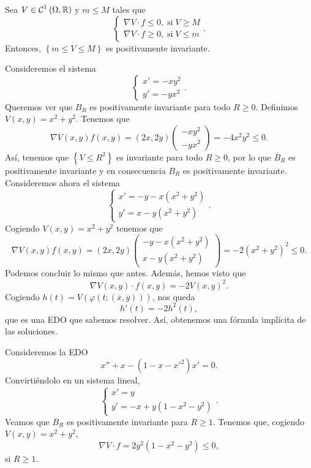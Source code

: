\begin{colorary}
Sea $\displaystyle V \in \mathcal{C}^{1}\left(\Omega , \mathbb{R}\right) $ y $\displaystyle m \leq M $ tales que  
\[
\begin{cases}
\nabla V \cdot f \leq 0, \; \text{si} \; V \geq M \\
\nabla V \cdot f \geq 0, \; \text{si} \; V \leq m
\end{cases}
.\]
Entonces, $\displaystyle \left\{ m \leq V \leq M\right\}  $ es positivamente invariante. 
\end{colorary}
\begin{eg}[Problema 47]
Consideremos el sistema 
\[
\begin{cases}
x' = - x y ^{2} \\ 
y' = - y x^{2}
\end{cases}
.\]
Queremos ver que $\displaystyle B_{R} $ es positivamente invariante para todo $\displaystyle R \geq 0 $. Definimos $\displaystyle V\left(x,y\right)=x^{2}+y^{2} $. Tenemos que 
\[\nabla V\left(x,y\right) f\left(x,y\right)=\left(2x,2y\right)\begin{pmatrix} -xy^{2} \\ -yx^{2} \end{pmatrix}=-4x^{2}y^{2}\leq 0 .\]
Así, tenemos que $\displaystyle \left\{ V \leq R^{2}\right\}  $ es invariante para todo $\displaystyle R \geq 0 $, por lo que $\displaystyle \overline{B}_{R} $ es positivamente invariante y en consecuencia $\displaystyle B_{R} $ es positivamente invariante. \\
Consideremos ahora el sistema
\[
\begin{cases}
x' = -y -x\left(x^{2}+y^{2}\right)\\
y' = x - y \left(x^{2}+y^{2}\right)
\end{cases}
.\]
Cogiendo $\displaystyle V\left(x,y\right)=x^{2}+y^{2} $ tenemos que 
\[\nabla V\left(x,y\right)f\left(x,y\right)=\left(2x,2y\right)\begin{pmatrix} -y-x\left(x^{2}+y^{2}\right)\\ x-y\left(x^{2}+y^{2}\right) \end{pmatrix}=-2\left(x^{2}+y^{2}\right)^{2}\leq 0 .\]
Podemos concluir lo mismo que antes. Además, hemos visto que 
\[\nabla V \left(x,y\right) \cdot f\left(x,y\right)=-2V\left(x,y\right)^{2} .\]
Cogiendo $\displaystyle h\left(t\right)=V\left(\varphi\left(t; \left(\overline{x}, \overline{y}\right)\right)\right) $, nos queda 
\[h'\left(t\right)=-2h^{2}\left(t\right) ,\]
que es una EDO que sabemos resolver. Así, obtenemos una fórmula implícita de las soluciones. 
\end{eg}
\begin{eg}
Consideremos la EDO
\[x'' + x - \left(1-x-x'^{2}\right)x' = 0 .\]
Convirtiéndolo en un sistema lineal,
\[
\begin{cases}
x' = y \\
y' = - x + y\left(1-x^{2}-y^{2}\right)
\end{cases}
.\]
Veamos que $\displaystyle B_{R} $ es positivamente invariante para $\displaystyle R \geq 1 $. Tenemos que, cogiendo $\displaystyle V\left(x,y\right)=x^{2}+y^{2} $, 
\[\nabla V \cdot f = 2y^{2}\left(1-x^{2}-y^{2}\right) \leq 0,\]
si $\displaystyle R \geq 1 $. 
\end{eg}
